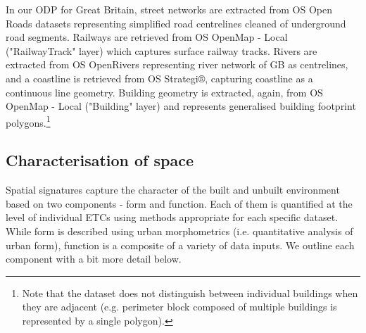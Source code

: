 
In our ODP for Great Britain, street networks are extracted from OS
Open Roads datasets\cite{openroads2020} representing simplified road centrelines
cleaned of underground road segments.
Railways are retrieved from OS OpenMap - Local\cite{openmap2020}
("RailwayTrack" layer) which captures surface railway tracks. Rivers are extracted from
OS OpenRivers\cite{openrivers2020} representing river network of GB as centrelines, and a coastline is
retrieved from OS Strategi®\cite{strategi2016}, capturing coastline as a continuous line
geometry. Building geometry is extracted, again, from OS OpenMap - Local ("Building"
layer) and represents generalised building footprint polygons.\footnote{Note that the dataset
does not distinguish between individual buildings when they are adjacent (e.g. perimeter
block composed of multiple buildings is represented by a single polygon).}

\subsection*{Characterisation of space}
Spatial signatures capture the character of the built and unbuilt environment
based on two components - form and function. Each of them is quantified at the level of
individual ETCs using methods appropriate for each specific dataset. While form
is described using urban morphometrics (i.e. quantitative analysis of urban
form)\cite{dibble2019origin}, function is a composite of a variety of data inputs. We outline each
component with a bit more detail below.

